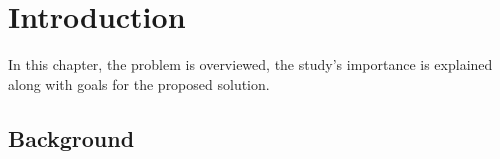\chapter{Introduction}\label{chap:intro}

In this chapter, the problem is overviewed, the study’s importance is explained along with goals for the proposed solution. 

\section{Background}
